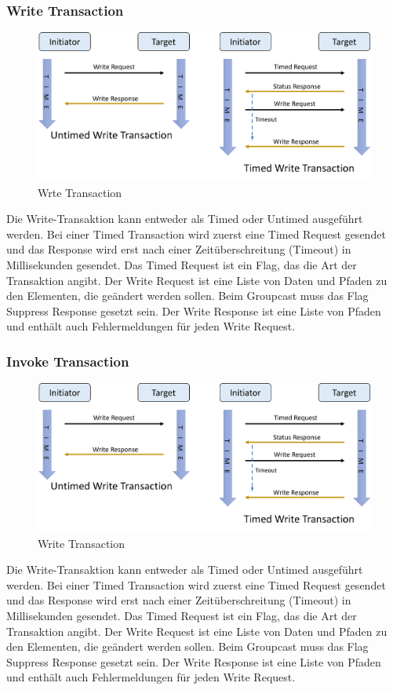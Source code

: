 \documentclass[12pt, a4paper]{article}
\begin{document}
\subsubsection{Write Transaction}
\begin{figure}[h]
  \centering
  \includegraphics[scale=0.5]{write}
  \caption{Wrte Transaction}
  \label{Write Transaction}
\end{figure}
\par Die Write-Transaktion kann entweder als Timed oder Untimed ausgeführt werden. Bei einer Timed Transaction wird zuerst eine Timed Request gesendet und das Response wird erst nach einer Zeitüberschreitung (Timeout) in Millisekunden gesendet. Das Timed Request ist ein Flag, das die Art der Transaktion angibt. Der Write Request ist eine Liste von Daten und Pfaden zu den Elementen, die geändert werden sollen. Beim Groupcast muss das Flag Suppress Response gesetzt sein.  Der Write Response ist eine Liste von Pfaden und enthält auch Fehlermeldungen für jeden Write Request.

\subsubsection{Invoke Transaction}
\begin{figure}[h]
  \centering
  \includegraphics[scale=0.5]{write}
  \caption{Write Transaction}
  \label{Write Transaction}
\end{figure}
\par Die Write-Transaktion kann entweder als Timed oder Untimed ausgeführt werden. Bei einer Timed Transaction wird zuerst eine Timed Request gesendet und das Response wird erst nach einer Zeitüberschreitung (Timeout) in Millisekunden gesendet. Das Timed Request ist ein Flag, das die Art der Transaktion angibt. Der Write Request ist eine Liste von Daten und Pfaden zu den Elementen, die geändert werden sollen. Beim Groupcast muss das Flag Suppress Response gesetzt sein.  Der Write Response ist eine Liste von Pfaden und enthält auch Fehlermeldungen für jeden Write Request.
\end{document}
